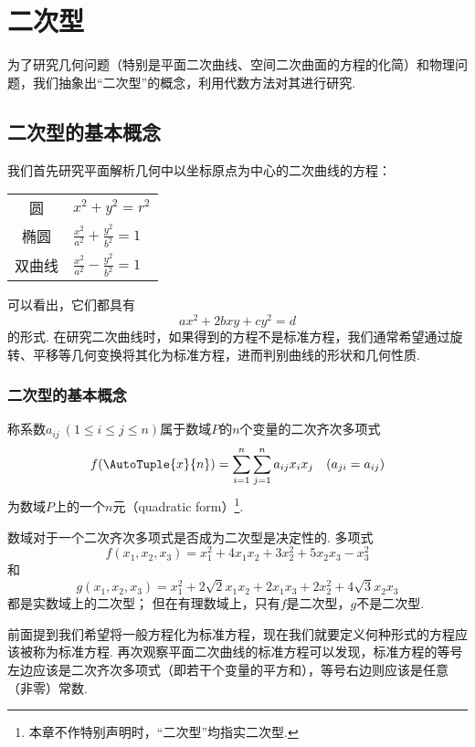 \chapter{二次型}
为了研究几何问题（特别是平面二次曲线、空间二次曲面的方程的化简）和物理问题，我们抽象出“二次型”的概念，利用代数方法对其进行研究.

\section{二次型的基本概念}
我们首先研究平面解析几何中以坐标原点为中心的二次曲线的方程：
\begin{center}
\def\arraystretch{1.5}
\begin{tabular}{cl}
圆 & \(x^2+y^2=r^2\) \\
椭圆 & \(\frac{x^2}{a^2}+\frac{y^2}{b^2}=1\) \\
双曲线 & \(\frac{x^2}{a^2}-\frac{y^2}{b^2}=1\) \\
\end{tabular}
\end{center}

可以看出，它们都具有\[
a x^2 + 2b xy + c y^2 = d
\]的形式.
在研究二次曲线时，如果得到的方程不是标准方程，我们通常希望通过旋转、平移等几何变换将其化为标准方程，进而判别曲线的形状和几何性质.

\subsection{二次型的基本概念}
\begin{definition}
称系数\(a_{ij}\ (1 \leqslant i \leqslant j \leqslant n)\)属于数域\(P\)的\(n\)个变量的二次齐次多项式\begin{equation}\label{equation:二次型.二次型}
f(\AutoTuple{x}{n})
= \sum\limits_{i=1}^n \sum\limits_{j=1}^n a_{ij} x_i x_j
\quad(a_{ji}=a_{ij})
\end{equation}为数域\(P\)上的一个\(n\)元（quadratic form）\footnote{%
本章不作特别声明时，“二次型”均指实二次型.}.
\end{definition}

数域对于一个二次齐次多项式是否成为二次型是决定性的.
多项式\[
f(x_1,x_2,x_3) = x_1^2 + 4 x_1 x_2 + 3 x_2^2 + 5 x_2 x_3 - x_3^2
\]和\[
g(x_1,x_2,x_3) = x_1^2 + 2\sqrt{2} x_1 x_2 + 2 x_1 x_3 + 2 x_2^2 + 4\sqrt{3} x_2 x_3
\]都是实数域上的二次型；
但在有理数域上，只有\(f\)是二次型，\(g\)不是二次型.

前面提到我们希望将一般方程化为标准方程，现在我们就要定义何种形式的方程应该被称为标准方程.
再次观察平面二次曲线的标准方程可以发现，标准方程的等号左边应该是二次齐次多项式（即若干个变量的平方和），等号右边则应该是任意（非零）常数.

